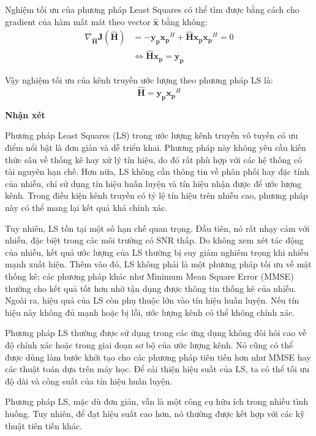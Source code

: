 Nghiệm tối ưu của phương pháp Least Squares có thể tìm được bằng cách cho gradient của hàm mất mát theo vector \( \bm{\hat{x}} \) bằng không:
% 
\begin{align*}
    \nabla_{\bm{\hat{H}}}\bm{J(\hat{H})}
    &= - \bm{y_p}\bm{x_p}^H + \bm{\hat{H}}\bm{x_p}\bm{x_p}^H = 0\\
    &\Leftrightarrow \bm{\hat{H}}\bm{x_p} = \bm{y_p}
\end{align*}

Vậy nghiệm tối ưu của kênh truyền ước lượng theo phương pháp LS là:
% 
\begin{equation}
    \bm{\hat{H}} = \bm{y_p}\bm{x_p}^H
\end{equation}

\textbf{Nhận xét}

Phương pháp Least Squares (LS) trong ước lượng kênh truyền vô tuyến có ưu điểm nổi bật là đơn giản và dễ triển khai. 
Phương pháp này không yêu cầu kiến thức sâu về thống kê hay xử lý tín hiệu, 
do đó rất phù hợp với các hệ thống có tài nguyên hạn chế. 
Hơn nữa, LS không cần thông tin về phân phối hay đặc tính của nhiễu, 
chỉ sử dụng tín hiệu huấn luyện và tín hiệu nhận được để ước lượng kênh. 
Trong điều kiện kênh truyền có tỷ lệ tín hiệu trên nhiễu cao, 
phương pháp này có thể mang lại kết quả khá chính xác.  

Tuy nhiên, LS tồn tại một số hạn chế quan trọng. 
Đầu tiên, nó rất nhạy cảm với nhiễu, đặc biệt trong các môi trường có SNR thấp. 
Do không xem xét tác động của nhiễu, kết quả ước lượng của LS thường bị suy giảm nghiêm trọng khi nhiễu mạnh xuất hiện. 
Thêm vào đó, LS không phải là một phương pháp tối ưu về mặt thống kê; 
các phương pháp khác như Minimum Mean Square Error (MMSE) thường cho kết quả tốt hơn nhờ tận dụng được thông tin thống kê của nhiễu. 
Ngoài ra, hiệu quả của LS còn phụ thuộc lớn vào tín hiệu huấn luyện. 
Nếu tín hiệu này không đủ mạnh hoặc bị lỗi, ước lượng kênh có thể không chính xác.

Phương pháp LS thường được sử dụng trong các ứng dụng không đòi hỏi cao về độ chính xác hoặc trong giai đoạn sơ bộ của ước lượng kênh. 
Nó cũng có thể được dùng làm bước khởi tạo cho các phương pháp tiên tiến hơn như MMSE hay các thuật toán dựa trên máy học. 
Để cải thiện hiệu suất của LS, ta có thể tối ưu độ dài và công suất của tín hiệu huấn luyện.

Phương pháp LS, mặc dù đơn giản, vẫn là một công cụ hữu ích trong nhiều tình huống. Tuy nhiên, để đạt hiệu suất cao hơn, nó thường được kết hợp với các kỹ thuật tiên tiến khác.

